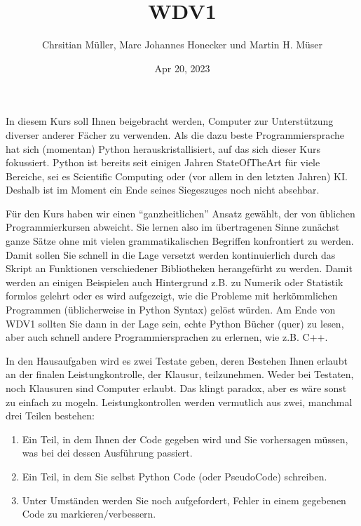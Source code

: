 \documentclass[letterpaper,10pt,english]{jupyterBook}
\title{WDV1}
\date{Apr 20, 2023}
\author{Chrsitian Müller, Marc Johannes Honecker und Martin H.\@{} Müser}
\begin{document}
\pagestyle{empty}
\sphinxmaketitle
\pagestyle{plain}
\sphinxtableofcontents
\pagestyle{normal}
\label{\detokenize{intro::doc}}


\sphinxAtStartPar
In diesem Kurs soll Ihnen beigebracht werden, Computer zur Unterstützung diverser anderer Fächer zu verwenden. Als die dazu beste
Programmiersprache hat sich (momentan) Python herauskristallisiert, auf das sich dieser Kurs fokussiert. Python ist bereits seit
einigen Jahren State\sphinxhyphen{}Of\sphinxhyphen{}The\sphinxhyphen{}Art für viele Bereiche, sei es Scientific Computing oder (vor allem in den letzten Jahren) KI.
Deshalb ist im Moment ein Ende seines Siegeszuges noch nicht absehbar.

\sphinxAtStartPar
Für den Kurs haben wir einen “ganzheitlichen” Ansatz gewählt, der von üblichen Programmierkursen abweicht. Sie lernen also im
übertragenen Sinne zunächst ganze Sätze ohne mit vielen grammatikalischen Begriffen konfrontiert zu werden. Damit sollen Sie
schnell in die Lage versetzt werden kontinuierlich durch das Skript an Funktionen verschiedener Bibliotheken herangefürht zu
werden. Damit werden an einigen Beispielen auch Hintergrund z.B. zu Numerik oder Statistik formlos gelehrt oder es wird aufgezeigt,
wie die Probleme mit herkömmlichen Programmen (üblicherweise in Python Syntax) gelöst würden. Am Ende von WDV\sphinxhyphen{}1 sollten Sie dann in
der Lage sein, echte Python Bücher (quer) zu lesen, aber auch schnell andere Programmiersprachen zu erlernen, wie z.B. C++.

\sphinxAtStartPar
In den Hausaufgaben wird es zwei Testate geben, deren Bestehen Ihnen erlaubt an der finalen Leistungkontrolle, der Klausur,
teilzunehmen. Weder bei Testaten, noch Klausuren sind Computer erlaubt. Das klingt paradox, aber es wäre sonst zu einfach zu
mogeln. Leistungkontrollen werden vermutlich aus zwei, manchmal drei Teilen bestehen:
\begin{enumerate}
%
\item {} 
\sphinxAtStartPar
Ein Teil, in dem Ihnen der Code gegeben wird und Sie vorhersagen müssen, was bei dei dessen Ausführung passiert.

\item {} 
\sphinxAtStartPar
Ein Teil, in dem Sie selbst Python Code (oder Pseudo\sphinxhyphen{}Code) schreiben.

\item {} 
\sphinxAtStartPar
Unter Umständen werden Sie noch aufgefordert, Fehler in einem gegebenen Code zu markieren/verbessern.

\end{enumerate}
\end{document}
